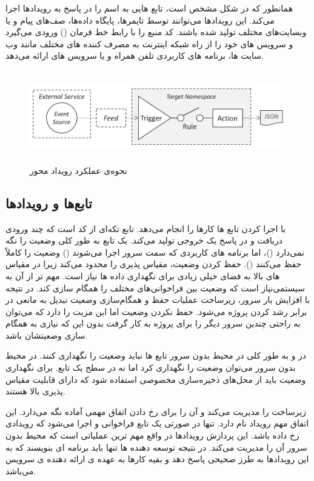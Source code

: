 همانطور که در شکل مشخص است،  تابع هایی به اسم  را در پاسخ به رویدادها اجرا می‌کند. این رویدادها می‌توانند توسط تایمرها، پایگاه داده‌ها، صف‌های پیام و یا وبسایت‌های مختلف تولید شده باشند.  کد منبع را با رابط خط فرمان () ورودی می‌گیرد و سرویس های خود را از راه  شبکه اینترنت به مصرف کننده های مختلف مانند وب سایت ها، برنامه های کاربردی تلفن همراه و یا سرویس های  ارائه می‌دهد. 
\begin{figure}[!h]
	\centering
	\includegraphics[height=4cm]{images/OW-event-action}
	\caption{نحوه‌ی عملکرد رویداد محور }
	\label{تصویر 2-1}
\end{figure}

\subsection{تابع‌ها و رویدادها}

 با اجرا کردن تابع ها کارها را انجام می‌دهد. تابع تکه‌ای از کد است که چند ورودی دریافت و در پاسخ یک خروجی تولید می‌کند. یک تابع به طور کلی وضعیت را نگه نمی‌دارد ()، اما برنامه های کاربردی که سمت سرور اجرا می‌شوند (‌) وضعیت را کاملاً حفظ می‌کنند (). حفظ کردن وضعیت، مقیاس پذیری را محدود می‌کند زیرا در مقیاس های بالا به فضای خیلی زیادی برای نگهداری داده ها نیاز است. مهم تر از آن به سیستمی‌نیاز است که وضعیت بین فراخوانی‌های مختلف را همگام سازی کند. در نتیجه با افزایش بار سرور، زیرساخت عملیات حفظ و همگام‌سازی وضعیت تبدیل به مانعی در برابر رشد کردن پروژه می‌شود. حفظ نکردن وضعیت اما این مزیت را دارد که می‌توان به راحتی چندین سرور دیگر را برای پروژه به کار گرفت بدون این که نیازی به همگام سازی وضعیتشان باشد.

در  و به طور کلی در محیط بدون سرور تابع ها نباید وضعیت را نگهداری کنند. در محیط بدون سرور می‌توان وضعیت را نگهداری کرد اما نه در سطح یک تابع. برای نگهداری وضعیت باید از محل‌های ذخیره‌سازی مخصوصی استفاده شود که دارای قابلیت مقیاس پذیری بالا هستند.

 زیرساخت را مدیریت می‌کند و آن را برای رخ دادن اتفاق مهمی آماده نگه می‌دارد. این اتفاق مهم رویداد نام دارد. تنها در صورتی یک تابع فراخوانی و اجرا می‌شود که رویدادی رخ داده باشد. این پردازش رویدادها در واقع مهم ترین عملیاتی است که محیط بدون سرور آن را مدیریت می‌کند. در نتیجه توسعه دهنده ها تنها باید برنامه ای بنویسند که به این رویدادها به طرز صحیحی پاسخ دهد و بقیه کارها به عهده ی ارائه دهنده ی سرویس می‌باشد.

